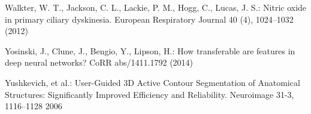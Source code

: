 \documentclass{llncs}
\begin{document}
\begin{thebibliography}{26}
Walkter, W. T., Jackson, C. L., Lackie, P. M., Hogg, C., Lucas, J. S.:
Nitric oxide in primary ciliary dyskinesia.
European Respiratory Journal 40 (4), 1024--1032 (2012)

Yosinski, J., Clune, J., Bengio, Y., Lipson, H.:
How transferable are features in deep neural networks?
CoRR abs/1411.1792  (2014)

Yushkevich, et al.:
User-Guided {3D} Active Contour Segmentation of Anatomical Structures: Significantly Improved Efficiency and Reliability.
Neuroimage 31-3, 1116--1128 2006

\end{thebibliography}


\clearpage
{} %
\renewcommand{\indexname}{Author Index}
\printindex
\clearpage
\end{document}

